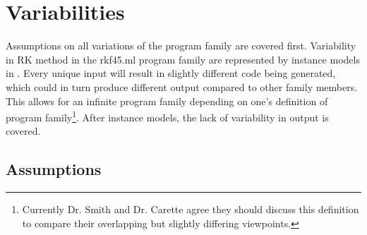\documentclass[12pt]{article}
\newcommand{\famname}{rkf45.ml} %
\begin{document}

\section{Variabilities}

Assumptions on all variations of the program family are covered first.
Variability in RK method in the \famname{} program family are represented by
instance models in . Every unique input will result in
slightly different code being generated, which could in turn produce different
output compared to other family members. This allows for an infinite program
family depending on one's definition of program family\footnote{Currently
  Dr. Smith and Dr. Carette agree they should discuss this definition to compare
  their overlapping but slightly differing viewpoints. }. After instance models, the lack of
variability in output is covered.

\subsection{Assumptions}\label{ssec:Assumptions}
\end{document}
